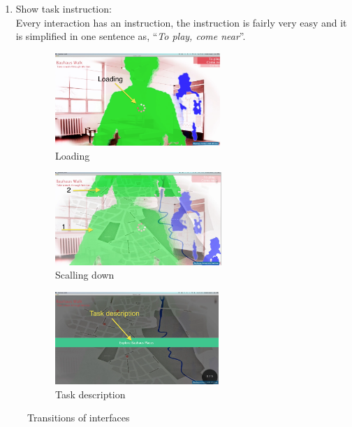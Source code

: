 \begin{enumerate}
\begin{enumerate}
\item Show task instruction:  \\
Every interaction has an instruction, the instruction is fairly very easy and it is simplified in one sentence as, ``\emph{To play, come near}''.
\end{enumerate}

\begin{figure}[H]
    \centering
    \begin{subfigure}[H]{0.3\textwidth}
        \centering
        \includegraphics[width=\textwidth,height = 3.5cm]{Figures/6/body/loading}
        \caption{Loading}
        \label{fig:loading_logo}
    \end{subfigure}
    \begin{subfigure}[H]{0.3\textwidth}
        \centering
        \includegraphics[width=\textwidth,height = 3.5cm]{Figures/6/body/scalling_down}
        \caption{Scalling down}
        \label{fig:scalling_down}
    \end{subfigure} 
      \begin{subfigure}[H]{0.3\textwidth}
        \centering
        \includegraphics[width=\textwidth,height = 3.5cm]{Figures/6/body/task_description}
        \caption{Task description}
        \label{fig:task_description}
    \end{subfigure}
    \caption{Transitions of interfaces }
    \label{fig:transition_sequence}
\end{figure}



\end{enumerate}
